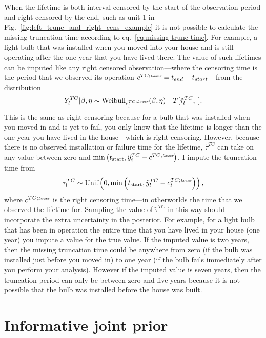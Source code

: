 When the lifetime is both interval censored by the start of the observation period and right censored by the end, such as unit 1 in Fig.~\ref{fig:left_trunc_and_right_cens_example} it is not possible to calculate the missing truncation time according to eq.~\eqref{eq:missing-trunc-time}. For example, a light bulb that was installed when you moved into your house and is still operating after the one year that you have lived there. The value of such lifetimes can be imputed like any right censored observation---where the censoring time is the period that we observed its operation $c^{TC;\textit{\tiny{Lower}}} = t_{end} - t_{start}$---from the distribution
\begin{equation}
    Y^{TC}_l|\beta, \eta \sim \hbox{Weibull}_{c^{TC;\textit{\tiny{Lower}}}_{l}}(\beta, \eta) \quad T[\tilde{\tau}^{TC}_l, \;]. 
\end{equation}
This is the same as right censoring because for a bulb that was installed when you moved in and is yet to fail, you only know that the lifetime is longer than the one year you have lived in the house---which is right censoring. However, because there is no observed installation or failure time for the lifetime, $\tilde{\tau}^{TC}$ can take on any value between zero and $\min\left(t_\text{start}, \tilde{y}^{TC}_i - c^{TC;\textit{\tiny{Lower}}}\right)$. I impute the truncation time from
\begin{equation}
    \label{eq:imp-trun-times}
    \tau^{TC}_l \sim \hbox{Unif}\left(0, \min\left(t_\text{start}, \tilde{y}^{TC}_l - c^{TC;\textit{\tiny{Lower}}}_l\right)\right),
\end{equation}
where $c^{TC;\textit{\tiny{Lower}}}$ is the right censoring time---in otherworlds the time that we observed the lifetime for. Sampling the value of $\tilde{\tau}^{TC}$ in this way should incorporate the extra uncertainty in the posterior. For example, for a light bulb that has been in operation the entire time that you have lived in your house (one year) you impute a value for the true value. If the imputed value is two years, then the missing truncation time could be anywhere from zero (if the bulb was installed just before you moved in) to one year (if the bulb fails immediately after you perform your analysis). However if the imputed value is seven years, then the truncation period can only be between zero and five years because it is not possible that the bulb was installed before the house was built.

\section{Informative joint prior} \label{sec:weibull-joint-prior}

